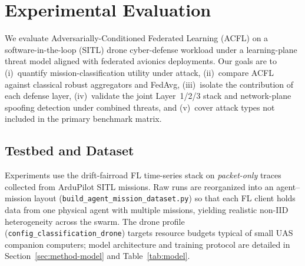%   
%

\section{Experimental Evaluation}
\label{sec:experiments}

We evaluate Adversarially-Conditioned Federated Learning (ACFL) on a software-in-the-loop (SITL) drone cyber-defense workload under a learning-plane threat model aligned with federated avionics deployments.
Our goals are to (i)~quantify mission-classification utility under attack, (ii)~compare ACFL against classical robust aggregators and FedAvg, (iii)~isolate the contribution of each defense layer, (iv)~validate the joint Layer~1/2/3 stack and network-plane spoofing detection under combined threats, and (v)~cover attack types not included in the primary benchmark matrix.

\subsection{Testbed and Dataset}
\label{sec:exp-testbed}

Experiments use the drift-fairroad FL time-series stack on \emph{packet-only} traces collected from ArduPilot SITL missions.
Raw runs are reorganized into an agent--mission layout (\texttt{build\_agent\_mission\_dataset.py}) so that each FL client holds data from one physical agent with multiple missions, yielding realistic non-IID heterogeneity across the swarm.
The drone profile (\texttt{config\_classification\_drone}) targets resource budgets typical of small UAS companion computers; model architecture and training protocol are detailed in Section~\ref{sec:method-model} and Table~\ref{tab:model}.

